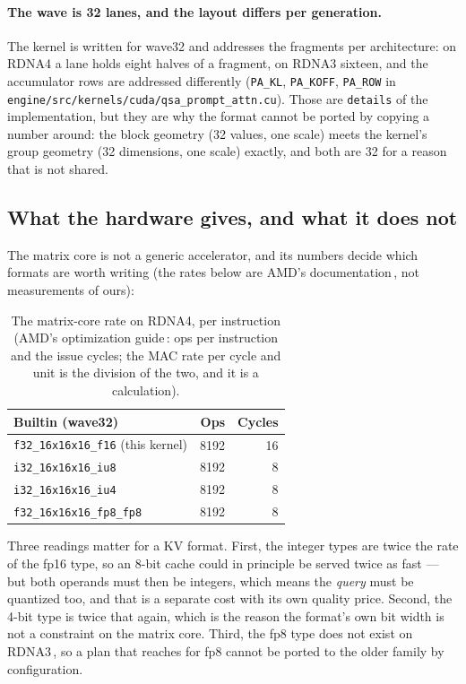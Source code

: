 \documentclass[10pt,twocolumn]{article}
\begin{document}
\paragraph{The wave is 32 lanes, and the layout differs per generation.} The kernel is written for wave32
and addresses the fragments per architecture: on RDNA4 a lane holds eight halves of a fragment, on RDNA3
sixteen, and the accumulator rows are addressed differently (\texttt{PA\_KL},
\texttt{PA\_KOFF}, \texttt{PA\_ROW} in \texttt{engine/src/kernels/cuda/qsa\_prompt\_attn.cu}). Those are
\texttt{details} of the implementation, but they are why the format cannot be ported by copying a number
around: the block geometry (32 values, one scale) meets the kernel's group geometry (32 dimensions, one
scale) exactly, and both are 32 for a reason that is not shared.

\subsection{What the hardware gives, and what it does not}

The matrix core is not a generic accelerator, and its numbers decide which formats are worth writing
(the rates below are AMD's documentation\,\cite{amdwmg}, not measurements of ours):

\begin{table}[t]
\centering
\caption{The matrix-core rate on RDNA4, per instruction (AMD's optimization guide\,\cite{amdwmg}: ops per
instruction and the issue cycles; the MAC rate per cycle and unit is the division of the two, and it is a
calculation).}
\label{tab:wmma}
\begin{tabular}{lrr}
\toprule
Builtin (wave32) & Ops & Cycles \\
\midrule
\texttt{f32\_16x16x16\_f16} (this kernel) & 8192 & 16 \\
\texttt{i32\_16x16x16\_iu8}          & 8192 &  8 \\
\texttt{i32\_16x16x16\_iu4}          & 8192 &  8 \\
\texttt{f32\_16x16x16\_fp8\_fp8}    & 8192 &  8 \\
\bottomrule
\end{tabular}
\end{table}

Three readings matter for a KV format. First, the integer types are twice the rate of the fp16 type, so
an 8-bit cache could in principle be served twice as fast --- but both operands must then be integers,
which means the \emph{query} must be quantized too, and that is a separate cost with its own quality
price. Second, the 4-bit type is twice that again, which is the reason the format's own bit width is not
a constraint on the matrix core. Third, the fp8 type does not exist on RDNA3\,\cite{rocwmma}, so a plan
that reaches for fp8 cannot be ported to the older family by configuration.
\end{document}
